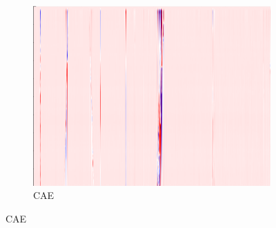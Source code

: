 \begin{figure}[!h]
\begin{subfigure}{0.33\textwidth}
        \includegraphics[width=\textwidth]{figures/test.png}
        \caption{CAE}
    \end{subfigure}
    
    \vspace{1em}
    

\end{figure}

